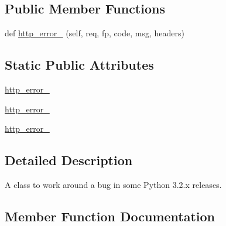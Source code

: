 \subsection*{Public Member Functions}
\begin{DoxyCompactItemize}
\item 
def \hyperlink{classpip_1_1__vendor_1_1distlib_1_1locators_1_1RedirectHandler_a4bb4988c4cc831e268e44b26a02ca899}{http\+\_\+error\+\_} (self, req, fp, code, msg, headers)
\end{DoxyCompactItemize}
\subsection*{Static Public Attributes}
\begin{DoxyCompactItemize}
\item 
\hyperlink{classpip_1_1__vendor_1_1distlib_1_1locators_1_1RedirectHandler_a12715378b90b80750394826b4fd8cf9e}{http\+\_\+error\+\_}
\item 
\hyperlink{classpip_1_1__vendor_1_1distlib_1_1locators_1_1RedirectHandler_a8102a278bea9bbf59c5d018f934f1e38}{http\+\_\+error\+\_}
\item 
\hyperlink{classpip_1_1__vendor_1_1distlib_1_1locators_1_1RedirectHandler_a970ce3a54db3cab2089f9fef95b2b216}{http\+\_\+error\+\_}
\end{DoxyCompactItemize}


\subsection{Detailed Description}
\begin{DoxyVerb}A class to work around a bug in some Python 3.2.x releases.
\end{DoxyVerb}
 

\subsection{Member Function Documentation}
\mbox{\label{classpip_1_1__vendor_1_1distlib_1_1locators_1_1RedirectHandler_a4bb4988c4cc831e268e44b26a02ca899}} 
